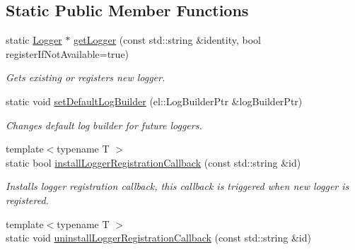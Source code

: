 \subsection*{Static Public Member Functions}
\begin{DoxyCompactItemize}
\item 
\hypertarget{classel_1_1Loggers_aaebf868c558e3ba1d2e4f073a00f1d4a}{static \hyperlink{classel_1_1Logger}{Logger} $\ast$ \hyperlink{classel_1_1Loggers_aaebf868c558e3ba1d2e4f073a00f1d4a}{get\-Logger} (const std\-::string \&identity, bool register\-If\-Not\-Available=true)}\label{classel_1_1Loggers_aaebf868c558e3ba1d2e4f073a00f1d4a}

\begin{DoxyCompactList}\small\item\em Gets existing or registers new logger. \end{DoxyCompactList}\item 
\hypertarget{classel_1_1Loggers_a15b377a3c48b2f8d037480275ee95850}{static void \hyperlink{classel_1_1Loggers_a15b377a3c48b2f8d037480275ee95850}{set\-Default\-Log\-Builder} (el\-::\-Log\-Builder\-Ptr \&log\-Builder\-Ptr)}\label{classel_1_1Loggers_a15b377a3c48b2f8d037480275ee95850}

\begin{DoxyCompactList}\small\item\em Changes default log builder for future loggers. \end{DoxyCompactList}\item 
\hypertarget{classel_1_1Loggers_a8df040fad4898c2682be34ba5128b61d}{{\footnotesize template$<$typename T $>$ }\\static bool \hyperlink{classel_1_1Loggers_a8df040fad4898c2682be34ba5128b61d}{install\-Logger\-Registration\-Callback} (const std\-::string \&id)}\label{classel_1_1Loggers_a8df040fad4898c2682be34ba5128b61d}

\begin{DoxyCompactList}\small\item\em Installs logger registration callback, this callback is triggered when new logger is registered. \end{DoxyCompactList}\item 
\hypertarget{classel_1_1Loggers_a68b2014268bf4f31a20b2c3ba923b679}{{\footnotesize template$<$typename T $>$ }\\static void \hyperlink{classel_1_1Loggers_a68b2014268bf4f31a20b2c3ba923b679}{uninstall\-Logger\-Registration\-Callback} (const std\-::string \&id)}\label{classel_1_1Loggers_a68b2014268bf4f31a20b2c3ba923b679}


\end{DoxyCompactItemize}
